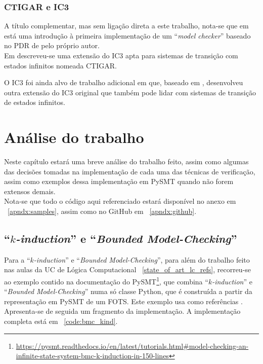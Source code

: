 \documentclass[11pt,a4paper]{report}%
\def\bmc{``\textit{Bounded Model-Checking}''\xspace}
\def\lc{Lógica Computacional\xspace}
\def\kind{``\textit{$k$-induction}''\xspace}
\begin{document}
\subsection*{CTIGAR e IC3}

A título complementar, mas sem ligação direta a este trabalho, nota-se que
em \cite{ic3} está uma introdução à primeira implementação de um ``\textit{model checker}''
baseado no PDR de \cite{pdr_original} pelo próprio autor.\\

Em \cite{ctigar} descreveu-se uma extensão do IC3 apta para sistemas de transição com estados
infinitos nomeada CTIGAR.

O IC3 foi ainda alvo de trabalho adicional em \cite{ic3_vienna} que, baseado em
\cite{ctigar}, desenvolveu outra extensão do IC3 original que também pode lidar com
sistemas de transição de estados infinitos.

\chapter{Análise do trabalho}
\label{chap:analysis}

Neste capítulo estará uma breve análise do trabalho feito, assim como algumas das
decisões tomadas na implementação de cada uma das técnicas de verificação,
assim como exemplos dessa implementação em PySMT quando não forem extensos demais.\\

Nota-se que todo o código aqui referenciado estará disponível no anexo em
~\ref{apndx:samples}, assim como no GitHub em ~\ref{apndx:github}.

\section{\kind e \bmc}
\label{analysis:kindbmc}

Para a \kind e \bmc, para além do trabalho feito nas aulas da UC de \lc
~\ref{state_of_art_lc_refs}, recorreu-se ao exemplo contido na documentação do 
PySMT\footnote{\url{https://pysmt.readthedocs.io/en/latest/tutorials.html#model-checking-an-infinite-state-system-bmc-k-induction-in-150-lines}}, que combina \kind e \bmc numa
só classe Python, que é construída a partir da representação em PySMT de um FOTS.
Este exemplo usa como referências \cite{bmc, kind_original}.\\

Apresenta-se de seguida um fragmento da implementação.
A implementação completa está em ~\ref{code:bmc_kind}.
\end{document}
